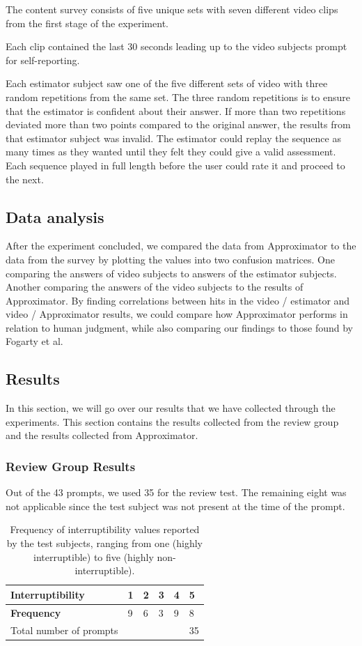 \documentclass{sigchi}
\begin{document}
The content survey consists of five unique sets with seven different video clips from the first stage of the experiment.

Each clip contained the last 30 seconds leading up to the video subjects prompt for self-reporting.

Each estimator subject saw one of the five different sets of video with three random repetitions from the same set.
The three random repetitions is to ensure that the estimator is confident about their answer.
If more than two repetitions deviated more than two points compared to the original answer, the results from that estimator subject was invalid.
The estimator could replay the sequence as many times as they wanted until they felt they could give a valid assessment.
Each sequence played in full length before the user could rate it and proceed to the next.

\subsection{Data analysis}
After the experiment concluded, we compared the data from Approximator to the data from the survey by plotting the values into two confusion matrices.
One comparing the answers of video subjects to answers of the estimator subjects.
Another comparing the answers of the video subjects to the results of Approximator.
By finding correlations between hits in the video / estimator and video / Approximator results, we could compare how Approximator performs in relation to human judgment, while also comparing our findings to those found by Fogarty et al. \cite{fogarty2005predicting}

\subsection{Results}
In this section, we will go over our results that we have collected through the experiments.
This section contains the results collected from the review group and the results collected from Approximator.

\subsubsection{Review Group Results}
Out of the 43 prompts, we used 35 for the review test.
The remaining eight was not applicable since the test subject was not present at the time of the prompt.

\begin{table}[h]
  \centering
    \begin{tabular}{@{}llllll@{}}
    \toprule
    \textbf{Interruptibility} & 1 & 2 & 3 & 4 & 5  \\ \midrule
    \textbf{Frequency}        & 9 & 6 & 3 & 9 & 8  \\ \midrule
    Total number of prompts   &   &   &   &   & 35
    \end{tabular}
    \caption{Frequency of interruptibility values reported by the test subjects, ranging from one (highly interruptible) to five (highly non-interruptible).}
    \label{fig:interruptibilityFrequency}
\end{table}
\end{document}
